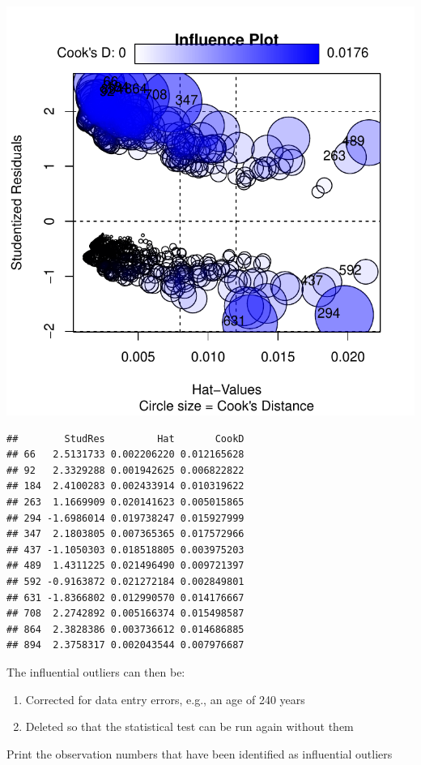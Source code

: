\documentclass[
]{article}
\begin{document}
\includegraphics{3_logistic_regression_files/figure-latex/outliers_plot-1.pdf}

\begin{verbatim}
##        StudRes         Hat       CookD
## 66   2.5131733 0.002206220 0.012165628
## 92   2.3329288 0.001942625 0.006822822
## 184  2.4100283 0.002433914 0.010319622
## 263  1.1669909 0.020141623 0.005015865
## 294 -1.6986014 0.019738247 0.015927999
## 347  2.1803805 0.007365365 0.017572966
## 437 -1.1050303 0.018518805 0.003975203
## 489  1.4311225 0.021496490 0.009721397
## 592 -0.9163872 0.021272184 0.002849801
## 631 -1.8366802 0.012990570 0.014176667
## 708  2.2742892 0.005166374 0.015498587
## 864  2.3828386 0.003736612 0.014686885
## 894  2.3758317 0.002043544 0.007976687
\end{verbatim}

The influential outliers can then be:

\begin{enumerate}
\def\labelenumi{\arabic{enumi}.}
\item
  Corrected for data entry errors, e.g., an age of 240 years
\item
  Deleted so that the statistical test can be run again without them
\end{enumerate}

Print the observation numbers that have been identified as influential
outliers
\end{document}
